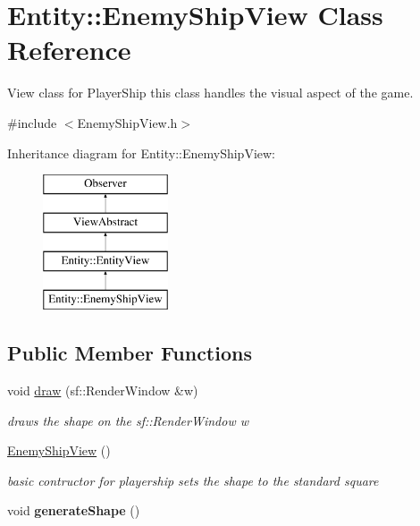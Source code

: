 \hypertarget{classEntity_1_1EnemyShipView}{}\section{Entity\+:\+:Enemy\+Ship\+View Class Reference}
\label{classEntity_1_1EnemyShipView}


View class for Player\+Ship this class handles the visual aspect of the game.  




{\ttfamily \#include $<$Enemy\+Ship\+View.\+h$>$}

Inheritance diagram for Entity\+:\+:Enemy\+Ship\+View\+:\begin{figure}[H]
\begin{center}
\leavevmode
\includegraphics[height=4.000000cm]{classEntity_1_1EnemyShipView}
\end{center}
\end{figure}
\subsection*{Public Member Functions}
\begin{DoxyCompactItemize}
\item 
void \hyperlink{classEntity_1_1EnemyShipView_a3417632d012f12720ebbbe4b525b3c19}{draw} (sf\+::\+Render\+Window \&w)
\begin{DoxyCompactList}\small\item\em draws the shape on the sf\+::\+Render\+Window w \end{DoxyCompactList}\item 
\mbox{\label{classEntity_1_1EnemyShipView_a208188bb32ba97acefdd236227b223e6}} 
\hyperlink{classEntity_1_1EnemyShipView_a208188bb32ba97acefdd236227b223e6}{Enemy\+Ship\+View} ()
\begin{DoxyCompactList}\small\item\em basic contructor for playership sets the shape to the standard square \end{DoxyCompactList}\item 
\mbox{\label{classEntity_1_1EnemyShipView_ac023c3cd83fbc0ad66fa8221b006519b}} 
void {\bfseries generate\+Shape} ()
\end{DoxyCompactItemize}
